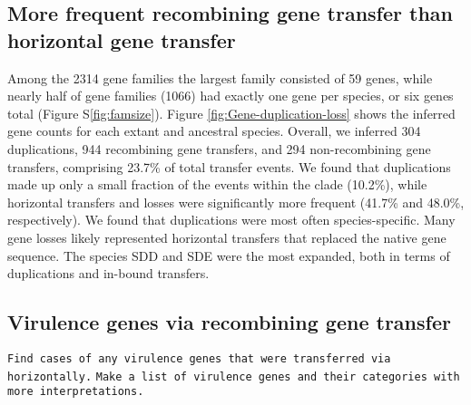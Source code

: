 \documentclass[english]{article}
\begin{document}
\subsection{More frequent recombining gene transfer than horizontal gene transfer}

Among the 2314 gene families the largest family consisted of 59 genes, while
nearly half of gene families (1066) had exactly one gene per species, or six
genes total (Figure S\ref{fig:famsize}).  Figure \ref{fig:Gene-duplication-loss}
shows the inferred gene counts for each extant and ancestral species. Overall,
we inferred 304 duplications, 944 recombining gene transfers, and 294
non-recombining gene transfers, comprising 23.7\% of total transfer events.  We
found that duplications made up only a small fraction of the events within the
clade (10.2\%), while horizontal transfers and losses were significantly more
frequent (41.7\% and 48.0\%, respectively). We found that duplications were most
often species-specific. Many gene losses likely represented horizontal transfers
that replaced the native gene sequence.  The species SDD and SDE were the most
expanded, both in terms of duplications and in-bound transfers.

\subsection{Virulence genes via recombining gene transfer}

\texttt{Find cases of any virulence genes that were transferred via horizontally.} 
\texttt{Make a list of virulence genes and their categories with more interpretations.}
\end{document}
